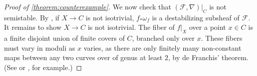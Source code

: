 \begin{proof}[Proof of \autoref{theorem:counterexample}]
We now check that $(\mathscr{F}, \nabla)|_C$ is not semistable.
By \cite[Theorem
4]{cataneseD:answer-to-a-question-by-fujita},
if $X \to C$ is not isotrivial,
$f_* \omega_f$ is a destabilizing subsheaf of $\mathscr F$.
It remains to show $X \to C$ is not isotrivial.
The fiber of $f|_X$ over a point $x\in C$ is a finite disjoint union of
finite covers of $C$, branched only over $x$. These fibers must vary in moduli as $x$ varies,
as there are only finitely many non-constant maps between any
two curves over of genus at least $2$,
by de Franchis' theorem.
(See \cite{de1913teorema} or \cite[Corollary 3, p.~75]{samuel1966lectures}, for
example.)
\end{proof}
